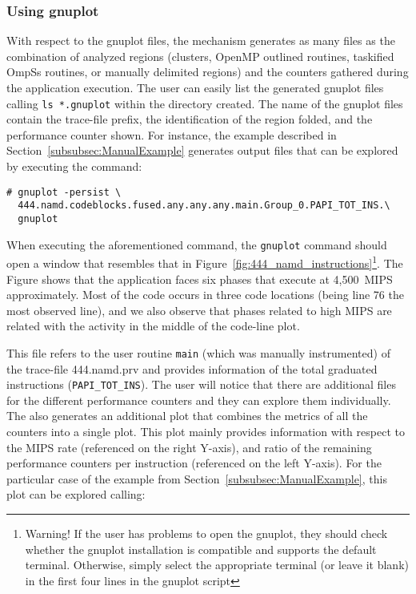 \subsubsection{Using gnuplot}

With respect to the gnuplot files, the \FOLDING mechanism generates as many files as the combination of analyzed regions (clusters, OpenMP outlined routines, taskified OmpSs routines, or manually delimited regions) and the counters gathered during the application execution.
The user can easily list the generated gnuplot files calling \texttt{ls *.gnuplot} within the directory created.
The name of the gnuplot files contain the trace-file prefix, the identification of the region folded, and the performance counter shown.
For instance, the example described in Section~\ref{subsubsec:ManualExample} generates output files that can be explored by executing the command:

\begin{verbatim}
# gnuplot -persist \
  444.namd.codeblocks.fused.any.any.any.main.Group_0.PAPI_TOT_INS.\
  gnuplot
\end{verbatim}

When executing the aforementioned command, the \texttt{gnuplot} command should open a window that resembles that in Figure~\ref{fig:444_namd_instructions}\footnote{Warning! If the user has problems to open the gnuplot, they should check whether the gnuplot installation is compatible and supports the default terminal. Otherwise, simply select the appropriate terminal (or leave it blank) in the first four lines in the gnuplot script}.
The Figure shows that the application faces six phases that execute at 4,500~MIPS approximately.
Most of the code occurs in three code locations (being line 76 the most observed line), and we also observe that phases related to high MIPS are related with the activity in the middle of the code-line plot.



This file refers to the user routine \texttt{main} (which was manually instrumented) of the trace-file 444.namd.prv and provides information of the total graduated instructions (\texttt{PAPI\_TOT\_INS}). 
The user will notice that there are additional files for the different performance counters and they can explore them individually.
The \FOLDING also generates an additional plot that combines the metrics of all the counters into a single plot.
This plot mainly provides information with respect to the MIPS rate (referenced on the right Y-axis), and ratio of the remaining performance counters per instruction (referenced on the left Y-axis).
For the particular case of the example from Section~\ref{subsubsec:ManualExample}, this plot can be explored calling:

